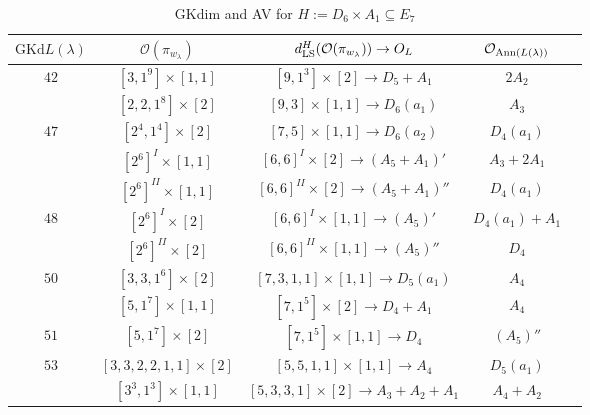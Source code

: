 \documentclass[reqno,12pt]{amsart}
\numberwithin{equation}{section}
\theoremstyle{plain}
\theoremstyle{definition}
\newcommand{\lam}{\lambda}
\renewcommand{\subset}{\subseteq}
\begin{document}
\begin{table}[htbp]\caption{ GKdim and AV for $H:=D_6\times A_1\subset E_7$}
	\label{tabd6a1}
	\centering
	\renewcommand{\arraystretch}{1.5}
	\setlength\tabcolsep{3pt}
{	
		\begin{tabular}{|c|c|c|c|c|}
		\hline $\mathrm{GKd} L(\lambda)$ &    $\mathcal{O}({\pi_{w_{\lam}}})$& $d_{\rm LS}^{H}(\mathcal{O}(\pi_{w_\lambda}))\rightarrow O_{L}$ & $\mathcal{O}_{{\rm Ann}(L(\lambda))}$ \\ \hline
$ 42$ 
&  $ [3,1^9]\times [1,1]$  &$[9,1^3]\times [2]\rightarrow  D_5+A_1$  &    $2A_2$       \\

&  $ [2,2,1^8]\times [2]$  &$[9,3]\times [1,1]\rightarrow  D_6(a_1)$  &   $A_3$\\
\hline

$ 47$ 
&  $ [2^4,1^4]\times [2]$  &$[7,5]\times [1,1]\rightarrow  D_6(a_2)$  &    $D_4(a_1)$       \\

&  \small{  $ [2^6]^{I}\times [1,1]$ }&$[6,6]^I\times [2]\rightarrow  (A_5+A_1)'$  &   $A_3+2A_1$\\
& \small{   $ [2^6]^{II}\times [1,1]$ } &$[6,6]^{II}\times [2]\rightarrow  (A_5+A_1)''$  &   $D_4(a_1)$\\

\hline

$ 48$ 
&  $ [2^6]^{I}\times [2]$ &$[6,6]^I\times [1,1]\rightarrow  (A_5)'$  &   $D_4(a_1)+A_1$\\
&   $ [2^6]^{II}\times [2]$  &$[6,6]^{II}\times [1,1]\rightarrow (A_5)''$ &   $D_4$\\
\hline

$ 50$ 
&  $ [3,3,1^6]\times [2]$  &$[7,3,1,1]\times [1,1]\rightarrow  D_5(a_1)$  &    $A_4$       \\

&  $ [5,1^7]\times [1,1]$  &$[7,1^5]\times [2]\rightarrow  D_4+A_1$  &   $A_4$\\
\hline
$ 51$ 
&  $ [5,1^7]\times [2]$  & $[7,1^5]\times [1,1]\rightarrow  D_4$  &   $(A_5)''$\\
\hline

$ 53$ 
&  $ [3,3,2,2,1,1]\times [2]$  & $[5,5,1,1]\times [1,1]\rightarrow  A_4$  &   $D_5(a_1)$ \\
&  $ [3^3,1^3]\times [1,1]$  & \small{$[5,3,3,1]\times [2]\rightarrow  A_3+A_2+A_1$  }&   $A_4+A_2$ \\
\hline


\end{tabular}}
\end{table}
\end{document}
